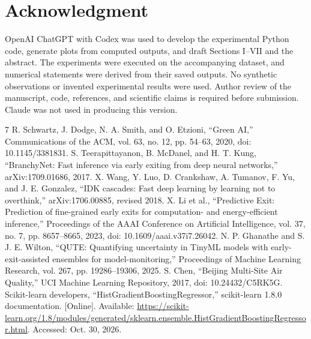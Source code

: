 \documentclass[conference,a4paper]{IEEEtran}
\begin{document}
\section*{Acknowledgment}
OpenAI ChatGPT with Codex was used to develop the experimental Python code, generate plots from computed outputs, and draft Sections I--VII and the abstract. The experiments were executed on the accompanying dataset, and numerical statements were derived from their saved outputs. No synthetic observations or invented experimental results were used. Author review of the manuscript, code, references, and scientific claims is required before submission. Claude was not used in producing this version.

\begin{thebibliography}{7}
 R. Schwartz, J. Dodge, N. A. Smith, and O. Etzioni, ``Green AI,'' Communications of the ACM, vol. 63, no. 12, pp. 54--63, 2020, doi: 10.1145/3381831.
 S. Teerapittayanon, B. McDanel, and H. T. Kung, ``BranchyNet: Fast inference via early exiting from deep neural networks,'' arXiv:1709.01686, 2017.
 X. Wang, Y. Luo, D. Crankshaw, A. Tumanov, F. Yu, and J. E. Gonzalez, ``IDK cascades: Fast deep learning by learning not to overthink,'' arXiv:1706.00885, revised 2018.
 X. Li et al., ``Predictive Exit: Prediction of fine-grained early exits for computation- and energy-efficient inference,'' Proceedings of the AAAI Conference on Artificial Intelligence, vol. 37, no. 7, pp. 8657--8665, 2023, doi: 10.1609/aaai.v37i7.26042.
 N. P. Ghanathe and S. J. E. Wilton, ``QUTE: Quantifying uncertainty in TinyML models with early-exit-assisted ensembles for model-monitoring,'' Proceedings of Machine Learning Research, vol. 267, pp. 19286--19306, 2025.
 S. Chen, ``Beijing Multi-Site Air Quality,'' UCI Machine Learning Repository, 2017, doi: 10.24432/C5RK5G.
 Scikit-learn developers, ``HistGradientBoostingRegressor,'' scikit-learn 1.8.0 documentation. [Online]. Available: \url{https://scikit-learn.org/1.8/modules/generated/sklearn.ensemble.HistGradientBoostingRegressor.html}. Accessed: Oct. 30, 2026.
\end{thebibliography}
\end{document}
